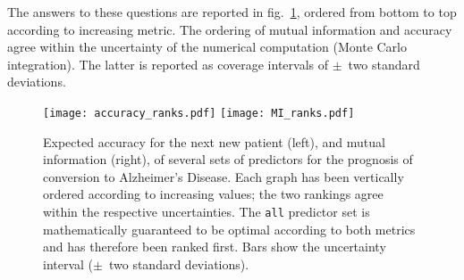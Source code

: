\documentclass[utf8]{FrontiersinHarvard} %
\newcommand*{\fig}{fig.}%
\renewcommand*{\|}[1][]{\nonscript\:#1\vert\nonscript\:\mathopen{}}
\newcommand*{\ad}{Alzheimer's Disease}
\begin{document}
The answers to these questions are reported in \fig~\ref{fig:mutual_info}, ordered from bottom to top according to increasing metric. The ordering of mutual information and accuracy agree within the uncertainty of the numerical computation (Monte Carlo integration). The latter is reported as coverage intervals of $\pm$~two standard deviations.
\begin{figure}[t]%
  \centering%
\texttt{[image: accuracy\_ranks.pdf]}%
\hfill%
\texttt{[image: MI\_ranks.pdf]}%
\caption{Expected accuracy for the next new patient (left), and mutual information (right), of several sets of predictors for the prognosis of conversion to \ad. Each graph has been vertically ordered according to increasing values; the two rankings agree within the respective uncertainties. The \texttt{all} predictor set is mathematically guaranteed to be optimal according to both metrics and has therefore been ranked first. Bars show the uncertainty interval ($\pm$~two standard deviations).}\label{fig:mutual_info}
\end{figure}%
\end{document}
